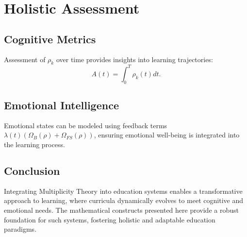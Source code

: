 \documentclass{article}
\theoremstyle{plain}
\theoremstyle{claimstyle}
\begin{document}
\section{Holistic Assessment}

\subsection{Cognitive Metrics}
Assessment of \( \rho_k \) over time provides insights into learning trajectories:
\begin{equation}
A(t) = \int_{0}^{T} \rho_k(t) dt.
\end{equation}

\subsection{Emotional Intelligence}
Emotional states can be modeled using feedback terms \( \lambda(t)(\Omega_B(\rho) + \Omega_{FS}(\rho)) \), ensuring emotional well-being is integrated into the learning process.

\subsection{Conclusion}
Integrating Multiplicity Theory into education systems enables a transformative approach to learning, where curricula dynamically evolves to meet cognitive and emotional needs. The mathematical constructs presented here provide a robust foundation for such systems, fostering holistic and adaptable education paradigms.
\end{document}
